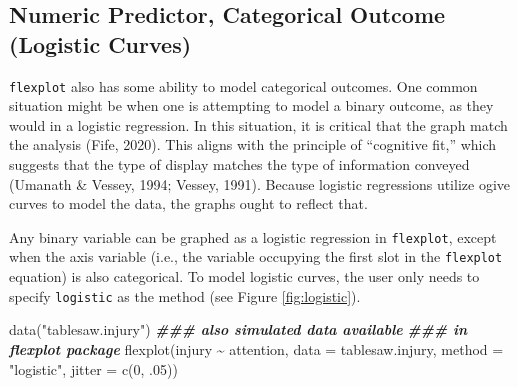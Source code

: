 \documentclass[
  english,
  man]{apa6}
\newenvironment{Shaded}{\begin{snugshade}}{\end{snugshade}}
\newcommand{\AttributeTok}[1]{\textcolor[rgb]{0.77,0.63,0.00}{#1}}
\newcommand{\DecValTok}[1]{\textcolor[rgb]{0.00,0.00,0.81}{#1}}
\newcommand{\DocumentationTok}[1]{\textcolor[rgb]{0.56,0.35,0.01}{\textbf{\textit{#1}}}}
\newcommand{\FunctionTok}[1]{\textcolor[rgb]{0.00,0.00,0.00}{#1}}
\newcommand{\NormalTok}[1]{#1}
\newcommand{\SpecialCharTok}[1]{\textcolor[rgb]{0.00,0.00,0.00}{#1}}
\newcommand{\StringTok}[1]{\textcolor[rgb]{0.31,0.60,0.02}{#1}}
\begin{document}
\hypertarget{numeric-predictor-categorical-outcome-logistic-curves}{%
\subsection{Numeric Predictor, Categorical Outcome (Logistic Curves)}\label{numeric-predictor-categorical-outcome-logistic-curves}}

\texttt{flexplot} also has some ability to model categorical outcomes. One common situation might be when one is attempting to model a binary outcome, as they would in a logistic regression. In this situation, it is critical that the graph match the analysis (Fife, 2020). This aligns with the principle of ``cognitive fit,'' which suggests that the type of display matches the type of information conveyed (Umanath \& Vessey, 1994; Vessey, 1991). Because logistic regressions utilize ogive curves to model the data, the graphs ought to reflect that.

Any binary variable can be graphed as a logistic regression in \texttt{flexplot}, except when the axis variable (i.e., the variable occupying the first slot in the \texttt{flexplot} equation) is also categorical. To model logistic curves, the user only needs to specify \texttt{logistic} as the method (see Figure \ref{fig:logistic}).

\small

\begin{Shaded}
\begin{Highlighting}[]
\FunctionTok{data}\NormalTok{(}\StringTok{"tablesaw.injury"}\NormalTok{) }\DocumentationTok{\#\#\# also simulated data available }
                        \DocumentationTok{\#\#\# in flexplot package}
\FunctionTok{flexplot}\NormalTok{(injury }\SpecialCharTok{\textasciitilde{}}\NormalTok{ attention, }\AttributeTok{data =}\NormalTok{ tablesaw.injury, }
             \AttributeTok{method =} \StringTok{"logistic"}\NormalTok{, }\AttributeTok{jitter =} \FunctionTok{c}\NormalTok{(}\DecValTok{0}\NormalTok{, .}\DecValTok{05}\NormalTok{))}
\end{Highlighting}
\end{Shaded}
\end{document}
